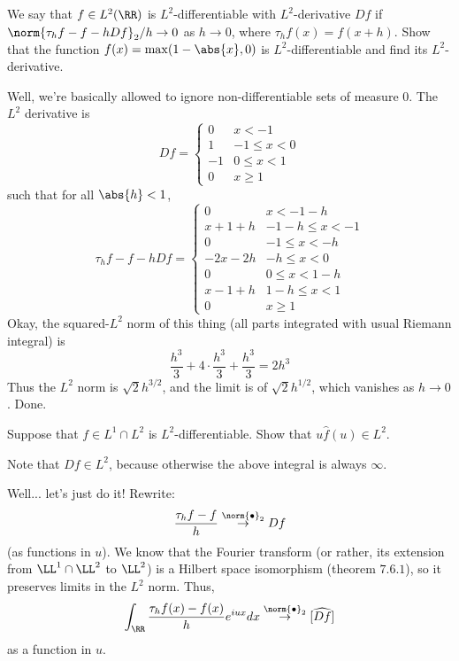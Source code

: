 \documentclass[11pt, headheight=30pt]{scrartcl}
\begin{document}
\section{}
\begin{prob}
    We say that $f \in L^2(\RR)$ is $L^2$-differentiable
    with $L^2$-derivative $Df$ if
    $\norm{\tau_h f - f - hDf}_2/h \to 0$ as $h \to 0$,
    where $\tau_h f(x) = f(x + h)$. Show that the
    function $f(x) = \max(1 - \abs{x}, 0)$ is
    $L^2$-differentiable and find its $L^2$-derivative.
\end{prob}

Well, we're basically allowed to ignore non-differentiable sets
of measure $0$. The $L^2$ derivative is
\[
    Df = \begin{cases}
        0 & x < -1\\
        1 & -1 \leq x < 0\\
        -1 & 0 \leq x < 1\\
        0 & x \geq 1
    \end{cases}    
\]
such that for all $\abs{h} < 1$,
\[
    \tau_hf - f - hDf = \begin{cases}
        0 & x < -1-h\\
        x+1+h & -1-h \leq x < -1 \\
        0 & -1 \leq x < -h\\
        -2x-2h & -h \leq x < 0\\
        0 & 0 \leq x < 1 - h\\
        x-1+h & 1 - h \leq x < 1\\
        0 & x \geq 1
    \end{cases}    
\]
Okay, the squared-$L^2$ norm of this thing (all parts
integrated with usual Riemann integral) is 
\[
    \frac{h^3}{3} + 4\cdot \frac{h^3}{3} + \frac{h^3}{3} = 2h^3
\]
Thus the $L^2$ norm is $\sqrt{2}h^{3/2}$, and the limit
is of $\sqrt{2}h^{1/2}$, which vanishes as $h \to 0$. Done.

\begin{prob}
    Suppose that $f \in L^1 \cap L^2$ is $L^2$-differentiable.
    Show that $u\hat{f}(u) \in L^2$.

\end{prob}
Note that $Df \in L^2$, because
otherwise the above integral
is always $\infty$.

Well... let's just do it! Rewrite:
\[
    \frac{\tau_h f - f}{h}\stackrel{\norm{\bullet}_2}{\to} Df
\]
(as functions in $u$). We know that the Fourier transform
(or rather, its extension from $\LL^1\cap \LL^2$ to $\LL^2$)
is a Hilbert space isomorphism (theorem $7.6.1$),
so it preserves limits in the $L^2$ norm. Thus,
\[
    \int_\RR \frac{\tau_h f(x) - f(x)}{h} e^{iux} dx \stackrel{\norm{\bullet}_2}{\to} [\widehat{Df}]
\]
as a function in $u$.
\end{document}
